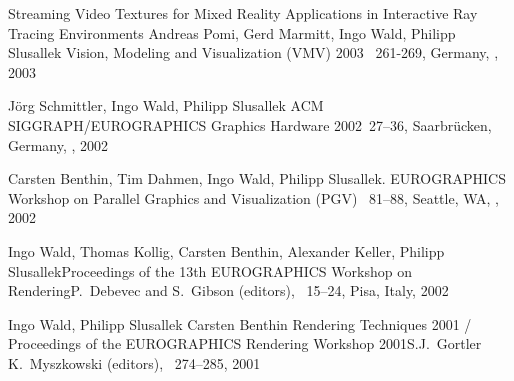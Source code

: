 \documentclass[letterpaper,11pt]{moderncv}
\begin{document}
  \cvbibitem
    {Streaming Video Textures for Mixed Reality Applications in
      Interactive Ray Tracing Environments}
{ Andreas Pomi, Gerd Marmitt, Ingo Wald, \und Philipp Slusallek}{ \proc Vision, Modeling and
    Visualization (VMV) 2003}{ \pages~261-269, 
Germany,
    , 2003}




{ J\"org Schmittler, Ingo Wald, \und Philipp Slusallek}{ \proc
    ACM SIGGRAPH/EUROGRAPHICS Graphics Hardware 2002}{\pages~27--36, Saarbrücken,
    Germany, , 2002}

{ Carsten Benthin, Tim Dahmen, Ingo Wald, \und Philipp Slusallek.
    }{ \proc
    EUROGRAPHICS Workshop on Parallel Graphics and Visualization (PGV)}{ \pages~81--88,
    Seattle, WA, , 2002}

{ Ingo Wald, Thomas Kollig, Carsten Benthin, Alexander Keller,
    \und Philipp Slusallek}{Proceedings of the 13th EUROGRAPHICS
    Workshop on Rendering}{P.~Debevec and S.~Gibson
  (editors), \pages~15--24, Pisa, Italy, 2002}



{Ingo Wald, Philipp Slusallek \und Carsten Benthin}{ Rendering Techniques 2001 / Proceedings of the EUROGRAPHICS
      Rendering Workshop 2001}{S.J.~Gortler \und K.~Myszkowski
      (editors), \pages~274--285, 
 2001}
\end{document}
